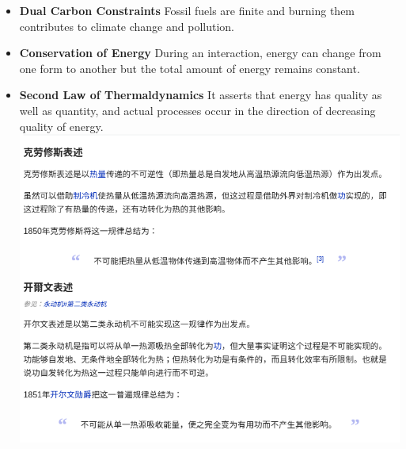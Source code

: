 \documentclass[twocolumn]{article}
\begin{document}
\begin{itemize}
\item \textbf{Dual Carbon Constraints} Fossil fuels are finite and
  burning them contributes to climate change and pollution.
\item \textbf{Conservation of Energy} During an interaction, energy
  can change from one form to another but the total amount of energy
  remains constant.  
\item \textbf{Second Law of Thermaldynamics} It asserts that energy
  has quality as well as quantity, and actual processes occur in the
  direction of decreasing quality of energy.
\includegraphics[scale=0.45]{snapshot102}

\end{itemize}
\end{document}
